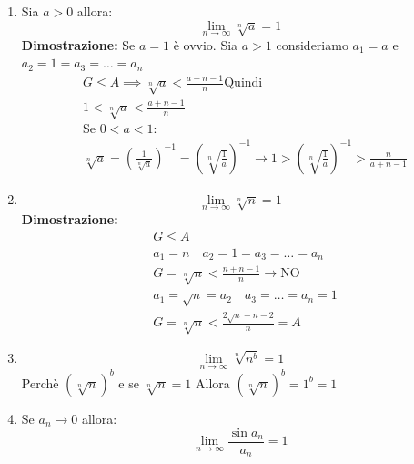 \begin{enumerate}
\def\labelenumi{\arabic{enumi})}
\item
  Sia \(a>0\) allora:
\[\lim_{ n \to \infty } \sqrt[n]{ a }=1 \]
\textbf{Dimostrazione:}
Se \(a=1\) è ovvio.
Sia \(a>1\) consideriamo \(a_1=a\) e \(a_{2}=1=a_{3}=\dots=a_{n}\)
\begin{align*} %
& G \leq A \implies \sqrt[n]{a} < \frac{a+n-1}{n} \text{Quindi }\\
& 1 < \sqrt[n]{a} < \frac{a+n-1}{n} \\
& \text{Se } 0<a<1: \\
& \sqrt[n]{a} = \left( \frac{1}{\sqrt[n]{a}} \right)^{-1}=\left( \sqrt[n]{\frac{1}{a}} \right)^{-1}\to 1 > \left( \sqrt[n]{\frac{1}{a}}\right)^{-1} > \frac{n}{a+n-1}
\end{align*}

\item
  \[\lim_{ n \to \infty } \sqrt[n]n=1\]
  \textbf{Dimostrazione:}
  \begin{align*} %
   & G\leq A \\
   & a_{1} = n \quad a_{2}=1=a_{3}=\dots=a_{n}\\
   & G = \sqrt[n] n < \frac{{n+n-1}}{n} \to \text{NO} \\
   & a_{1}=\sqrt n=a_{2} \quad a_{3}=\dots=a_{n}=1 \\
   & G = \sqrt[n] n < \frac{2\sqrt n + n -2}{n} = A
  \end{align*}
\item
  \[\lim_{ n \to \infty } \sqrt[n]{ n^b }=1\] Perchè
  \((\sqrt[n]{ n})^b\) e se \(\sqrt[n]{n}=1\) Allora
  \((\sqrt[n]{ n})^b=1^b=1\)
\item
  Se \(a_{n}\to 0\) allora:
  \[\lim_{ n \to \infty } \frac{\sin a_{n}}{a_{n}} = 1 \]
  

\end{enumerate}
